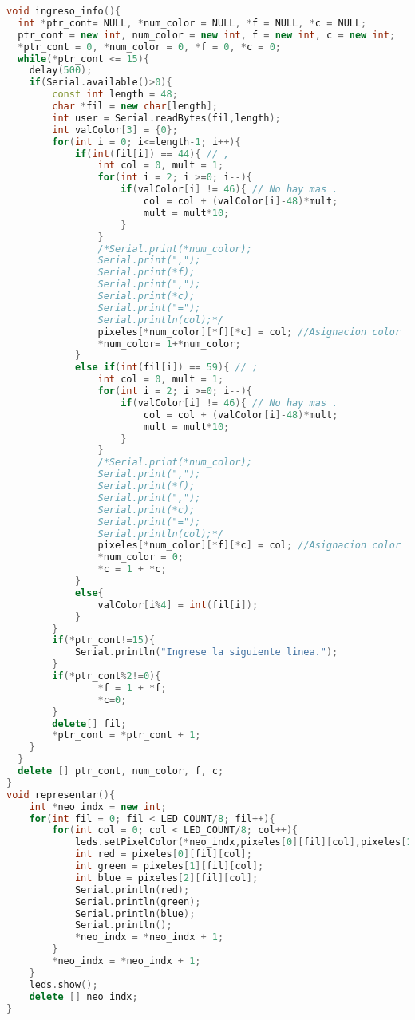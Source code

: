 \documentclass{article}
\begin{document}
\begin{lstlisting}[language=C++, label=error_electronica]
void ingreso_info(){
  int *ptr_cont= NULL, *num_color = NULL, *f = NULL, *c = NULL;
  ptr_cont = new int, num_color = new int, f = new int, c = new int;
  *ptr_cont = 0, *num_color = 0, *f = 0, *c = 0;
  while(*ptr_cont <= 15){
  	delay(500);
    if(Serial.available()>0){
    	const int length = 48;
    	char *fil = new char[length];
      	int user = Serial.readBytes(fil,length);
      	int valColor[3] = {0};
      	for(int i = 0; i<=length-1; i++){
        	if(int(fil[i]) == 44){ // ,
          		int col = 0, mult = 1;
          		for(int i = 2; i >=0; i--){
            		if(valColor[i] != 46){ // No hay mas .
              			col = col + (valColor[i]-48)*mult;
              			mult = mult*10;
            		}
                }
              	/*Serial.print(*num_color);
                Serial.print(",");
                Serial.print(*f);
                Serial.print(",");
                Serial.print(*c);
                Serial.print("=");
                Serial.println(col);*/
              	pixeles[*num_color][*f][*c] = col; //Asignacion color
              	*num_color= 1+*num_color;
    	    }
        	else if(int(fil[i]) == 59){ // ;
              	int col = 0, mult = 1;
          		for(int i = 2; i >=0; i--){
            		if(valColor[i] != 46){ // No hay mas .
              			col = col + (valColor[i]-48)*mult;
              			mult = mult*10;
            		}
                }
                /*Serial.print(*num_color);
                Serial.print(",");
                Serial.print(*f);
                Serial.print(",");
                Serial.print(*c);
                Serial.print("=");
                Serial.println(col);*/
            	pixeles[*num_color][*f][*c] = col; //Asignacion color
          		*num_color = 0;
          		*c = 1 + *c;
        	}
            else{
            	valColor[i%4] = int(fil[i]);
            }
      	}
      	if(*ptr_cont!=15){
        	Serial.println("Ingrese la siguiente linea.");
      	}
      	if(*ptr_cont%2!=0){
          		*f = 1 + *f;
          		*c=0;
       	}
      	delete[] fil;
	    *ptr_cont = *ptr_cont + 1;
    }
  }
  delete [] ptr_cont, num_color, f, c;
}
void representar(){
  	int *neo_indx = new int;
    for(int fil = 0; fil < LED_COUNT/8; fil++){
       	for(int col = 0; col < LED_COUNT/8; col++){
            leds.setPixelColor(*neo_indx,pixeles[0][fil][col],pixeles[1][fil][col],pixeles[2][fil][col]);
          	int red = pixeles[0][fil][col];
          	int green = pixeles[1][fil][col];
          	int blue = pixeles[2][fil][col];
          	Serial.println(red);
        	Serial.println(green);
         	Serial.println(blue);
          	Serial.println();
        	*neo_indx = *neo_indx + 1;
        }
      	*neo_indx = *neo_indx + 1;
    }
  	leds.show();
  	delete [] neo_indx;
}
\end{lstlisting}
\end{document}
